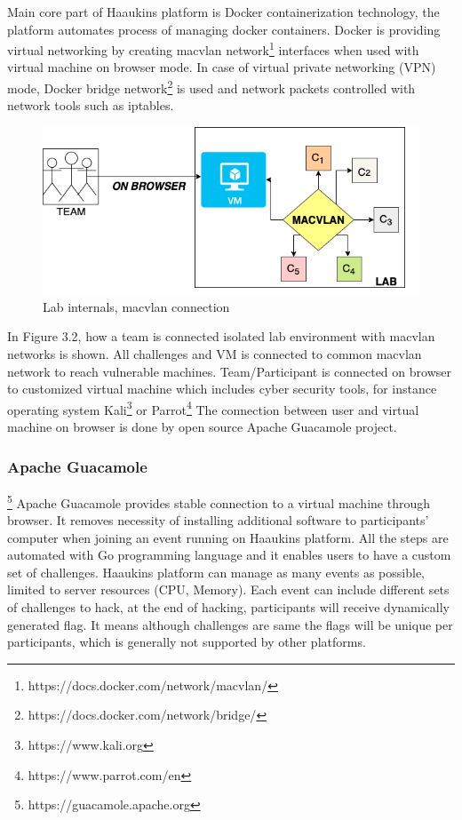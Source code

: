 Main core part of Haaukins platform is Docker containerization technology, the platform automates process of managing docker containers. Docker is providing virtual networking by creating macvlan network\footnote{https://docs.docker.com/network/macvlan/} interfaces when used with virtual machine on browser mode. 
In case of virtual private networking (VPN) mode, Docker bridge network\footnote{https://docs.docker.com/network/bridge/} is used and network packets controlled with network tools such as iptables.
\begin{figure}[htbp]
\centerline{\includegraphics[scale=.4]{figures/macvlan-arch.png}}
\caption{Lab internals, macvlan connection }
\label{fig}
\end{figure}
In Figure 3.2, how a team is connected isolated lab environment with macvlan networks is shown. All challenges and VM is connected to common macvlan network to reach vulnerable machines. Team/Participant is connected on browser to customized virtual machine which includes cyber security tools, for instance operating system Kali\footnote{https://www.kali.org} or Parrot\footnote{https://www.parrot.com/en} The connection between user and virtual machine on browser is done by open source Apache Guacamole project.

\subsubsection{Apache Guacamole}\footnote{https://guacamole.apache.org}
Apache Guacamole provides stable connection to a virtual machine through browser. It removes necessity of installing additional software to participants' computer when joining an event running on Haaukins platform. 
\newpage
All the steps are automated with Go programming language and it enables users to have a custom set of challenges. Haaukins platform can manage as many events as possible, limited to server resources (CPU, Memory). Each event can include different sets of challenges to hack, at the end of hacking, participants will receive dynamically generated flag. It means although challenges are same the flags will be unique per participants, which is generally not supported by other platforms. 

